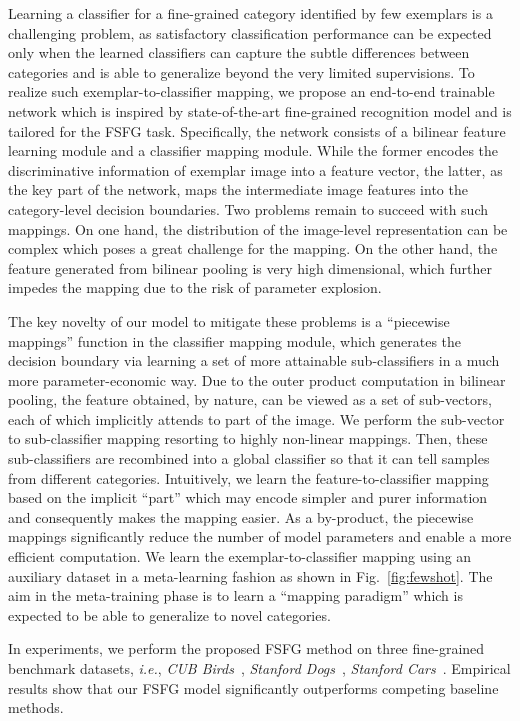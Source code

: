 \documentclass[10pt,twocolumn,letterpaper]{article}
\begin{document}
Learning a classifier for a fine-grained category identified by few exemplars is a challenging problem, as satisfactory classification performance can be expected only when the learned classifiers can capture the subtle differences between categories and is able to generalize beyond the very limited supervisions. To realize such exemplar-to-classifier mapping, we propose an end-to-end trainable network which is inspired by state-of-the-art fine-grained recognition model and is tailored for the FSFG task. Specifically, the network consists of a bilinear feature learning module and a classifier mapping module. While the former encodes the discriminative information of exemplar image into a feature vector, the latter, as the key part of the network, maps the intermediate image features into the category-level decision boundaries. Two problems remain to succeed with such mappings. On one hand, the distribution of the image-level representation can be complex which poses a great challenge for the mapping. On the other hand, the feature generated from bilinear pooling is very high dimensional, which further impedes the mapping due to the risk of parameter explosion.

The key novelty of our model to mitigate these problems is a ``piecewise mappings'' function in the classifier mapping module, which generates the decision boundary via learning a set of more attainable sub-classifiers in a much more parameter-economic way. Due to the outer product computation in bilinear pooling, the feature obtained, by nature, can be viewed as a set of sub-vectors, each of which implicitly attends to part of the image. We perform the sub-vector to sub-classifier mapping resorting to highly non-linear mappings. Then, these sub-classifiers are recombined into a global classifier so that it can tell samples from different categories. Intuitively, we learn the feature-to-classifier mapping based on the implicit ``part'' which may encode simpler and purer information and consequently makes the mapping easier. As a by-product, the piecewise mappings significantly reduce the number of model parameters and enable a more efficient computation. We learn the exemplar-to-classifier mapping using an auxiliary dataset in a meta-learning fashion as shown in Fig.~\ref{fig:fewshot}. The aim in the meta-training phase is to learn a ``mapping paradigm'' which is expected to be able to generalize to novel categories.

In experiments, we perform the proposed FSFG method on three fine-grained benchmark datasets, \emph{i.e.}, \emph{CUB Birds}~\cite{WahCUB200_2011}, \emph{Stanford Dogs}~\cite{Khosla11stanforddogs}, \emph{Stanford Cars}~\cite{cars}. Empirical results show that our FSFG model significantly outperforms competing baseline methods.
\end{document}
